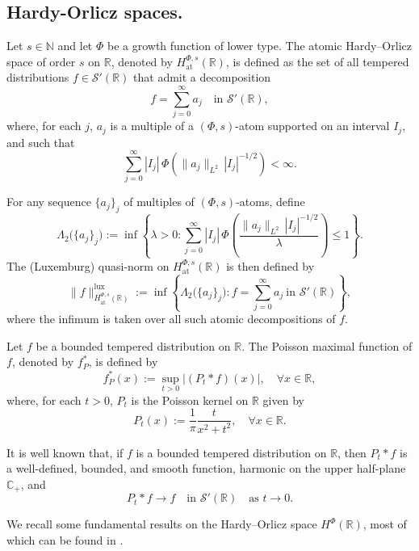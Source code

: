 \documentclass[a4paper,12pt,intlimits,oneside]{amsart}
\theoremstyle{definition}
\numberwithin{equation}{section}
\theoremstyle{definition}
\begin{document}
\subsection{Hardy-Orlicz spaces.} 


Let $s \in \mathbb{N}$ and let $\Phi$ be a growth function of lower type. The atomic Hardy--Orlicz space of order $s$ on $\mathbb{R}$, denoted by $H^{\Phi,s}_{\mathrm{at}}(\mathbb{R})$, is defined as the set of all tempered distributions $f \in \mathscr{S}'(\mathbb{R})$ that admit a decomposition
\[
f=\sum_{j=0}^{\infty} a_j \quad \text{in } \mathscr{S}'(\mathbb{R}),
\]
where, for each $j$, $a_j$ is a multiple of a $(\Phi,s)$-atom supported on an interval $I_j$, and such that
\[
\sum_{j=0}^{\infty} |I_j|\, \Phi\!\left( \|a_j\|_{L^2}\, |I_j|^{-1/2} \right) < \infty.
\]

For any sequence $\{a_j\}_j$ of multiples of $(\Phi,s)$-atoms, define
\[
\Lambda_2\big(\{a_j\}_j\big)
:= \inf \left\{ \lambda > 0 : 
\sum_{j=0}^{\infty} |I_j|\, 
\Phi\!\left( \frac{\|a_j\|_{L^2}\, |I_j|^{-1/2}}{\lambda} \right) \leq 1 
\right\}.
\]
The (Luxemburg) quasi-norm on $H^{\Phi,s}_{\mathrm{at}}(\mathbb{R})$ is then defined by
\[
\|f\|_{H^{\Phi,s}_{\mathrm{at}}(\mathbb{R})}^{\mathrm{lux}}
:= \inf \left\{ \Lambda_2\big(\{a_j\}_j\big) : 
f=\sum_{j=0}^{\infty} a_j \ \text{in } \mathscr{S}'(\mathbb{R}) 
\right\},
\]
where the infimum is taken over all such atomic decompositions of $f$.


\medskip


Let $f$ be a bounded tempered distribution on $\mathbb{R}$. The Poisson maximal function of $f$, denoted by $f_P^*$, is defined by
\[
f_P^*(x) := \sup_{t>0} |(P_t * f)(x)|, \quad \forall x \in \mathbb{R},
\]
where, for each $t>0$, $P_t$ is the Poisson kernel on $\mathbb{R}$ given by
\[
P_t(x) := \frac{1}{\pi} \frac{t}{x^2 + t^2}, \quad \forall x \in \mathbb{R}.
\]

It is well known that, if $f$ is a bounded tempered distribution on $\mathbb{R}$, then $P_t * f$ is a well-defined, bounded, and smooth function, harmonic on the upper half-plane $\mathbb{C}_+$, and
\[
P_t * f \longrightarrow f \quad \text{in } \mathscr{S}'(\mathbb{R}) \quad \text{as } t \to 0.
\]

We recall some fundamental results on the Hardy--Orlicz space $H^{\Phi}(\mathbb{R})$, most of which can be found in \cite{yangLiangKy}.
\end{document}
